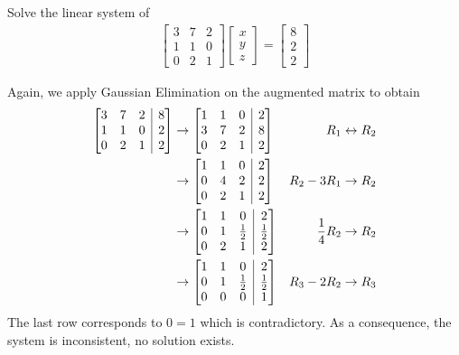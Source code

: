 \begin{exmp}
\label{ex:nosol}
Solve the linear system of
\begin{align*}
\begin{bmatrix}
3 & 7 & 2 \\
1 & 1 & 0 \\
0 & 2 & 1 
\end{bmatrix}
\begin{bmatrix}
x \\
y \\
z
\end{bmatrix}
=
\begin{bmatrix}
8 \\
2 \\
2
\end{bmatrix}   
\end{align*}
\end{exmp}
\begin{solution} Again, we apply Gaussian Elimination on the augmented matrix to obtain
\begin{align*}
\left[\begin{array}{@{}ccc|c@{}}
3 & 7 & 2 & 8 \\
1 & 1 & 0 & 2 \\
0 & 2 & 1 & 2
\end{array}\right] 
& \to 
\left[\begin{array}{@{}ccc|c@{}}
1 & 1 & 0 & 2 \\
3 & 7 & 2 & 8 \\
0 & 2 & 1 & 2
\end{array}\right] 
& R_1 \leftrightarrow R_2 \\
& \to 
\left[\begin{array}{@{}ccc|c@{}}
1 & 1 & 0 & 2 \\
0 & 4 & 2 & 2 \\
0 & 2 & 1 & 2
\end{array}\right] 
& R_2-3R_1 \to R_2 \\
& \to 
\left[\begin{array}{@{}ccc|c@{}}
1 & 1 & 0 & 2 \\
0 & 1 & \frac{1}{2} & \frac{1}{2} \\
0 & 2 & 1 & 2
\end{array}\right] 
& \frac{1}{4}R_2 \to R_2 \\
& \to 
\left[\begin{array}{@{}ccc|c@{}}
1 & 1 & 0 & 2 \\
0 & 1 & \frac{1}{2} & \frac{1}{2} \\
0 & 0 & 0 & 1
\end{array}\right] 
& R_3 - 2R_2 \to R_3
\end{align*}
The last row corresponds to $0 = 1$ which is contradictory. As a consequence, the system is inconsistent, no solution exists.
\end{solution}


